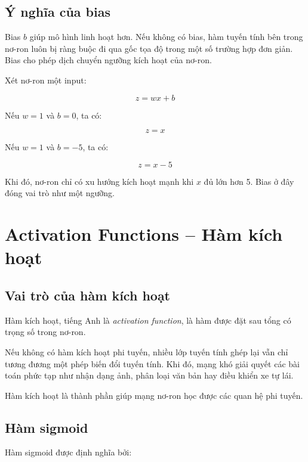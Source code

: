 \subsection{Ý nghĩa của bias}

Bias $b$ giúp mô hình linh hoạt hơn. Nếu không có bias, hàm tuyến tính bên trong nơ-ron luôn bị ràng buộc đi qua gốc tọa độ trong một số trường hợp đơn giản. Bias cho phép dịch chuyển ngưỡng kích hoạt của nơ-ron.

\begin{vidu}
Xét nơ-ron một input:

\[
    z = wx + b
\]

Nếu $w=1$ và $b=0$, ta có:

\[
    z = x
\]

Nếu $w=1$ và $b=-5$, ta có:

\[
    z = x - 5
\]

Khi đó, nơ-ron chỉ có xu hướng kích hoạt mạnh khi $x$ đủ lớn hơn 5. Bias ở đây đóng vai trò như một ngưỡng.
\end{vidu}

\section{Activation Functions -- Hàm kích hoạt}

\subsection{Vai trò của hàm kích hoạt}

Hàm kích hoạt, tiếng Anh là \textit{activation function}, là hàm được đặt sau tổng có trọng số trong nơ-ron.

Nếu không có hàm kích hoạt phi tuyến, nhiều lớp tuyến tính ghép lại vẫn chỉ tương đương một phép biến đổi tuyến tính. Khi đó, mạng khó giải quyết các bài toán phức tạp như nhận dạng ảnh, phân loại văn bản hay điều khiển xe tự lái.

\begin{ghinho}
Hàm kích hoạt là thành phần giúp mạng nơ-ron học được các quan hệ phi tuyến.
\end{ghinho}

\subsection{Hàm sigmoid}

Hàm sigmoid được định nghĩa bởi:

